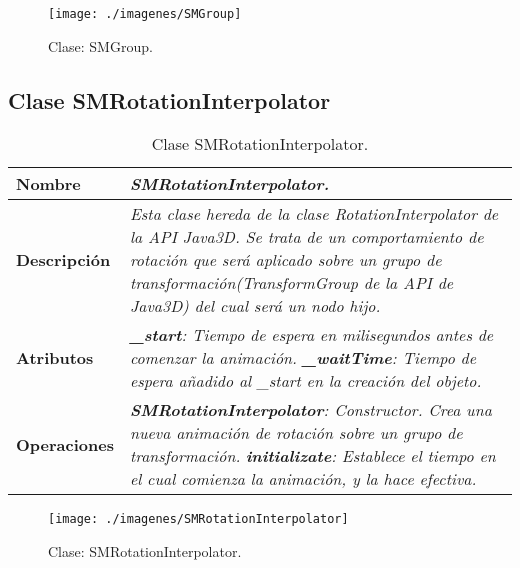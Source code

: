          \begin{figure} [H] \begin{center}
            \texttt{[image: ./imagenes/SMGroup]}\label{SMGroup}
            \caption{Clase: SMGroup.}
         \end{center} \end{figure}

      \subsection{Clase SMRotationInterpolator}
         \begin{table}[!ht] 
            \centering
            \begin{tabular}{|p{4cm}|p{11.5cm}|}
            \hline
            \textbf{Nombre} & \textit{SMRotationInterpolator.}\\ \hline
            \textbf{Descripción} & \textit{Esta clase hereda de la clase RotationInterpolator de la API Java3D. Se trata de un
                                    comportamiento de rotación que será aplicado sobre un grupo de transformación(TransformGroup
                                    de la API de Java3D) del cual será un nodo hijo.}\\ \hline
            \textbf{Atributos} & \textit{\textbf{\_start}: Tiempo de espera en milisegundos antes de comenzar la animación.}\newline
                                 \textit{\textbf{\_waitTime}: Tiempo de espera añadido al \_start en la creación del objeto.}\\ \hline
            \textbf{Operaciones} & \textit{\textbf{SMRotationInterpolator}: Constructor. Crea una nueva animación de rotación sobre un
                                          grupo de transformación.}\newline
                                    \textit{\textbf{initializate}: Establece el tiempo en el cual comienza la animación, y la hace efectiva.}\\ \hline
            \end{tabular}
            \caption{Clase SMRotationInterpolator.}
         \end{table}
         \begin{figure} [H] \begin{center}
            \texttt{[image: ./imagenes/SMRotationInterpolator]}\label{SMRotationInterpolator}
            \caption{Clase: SMRotationInterpolator.}
         \end{center} \end{figure}

